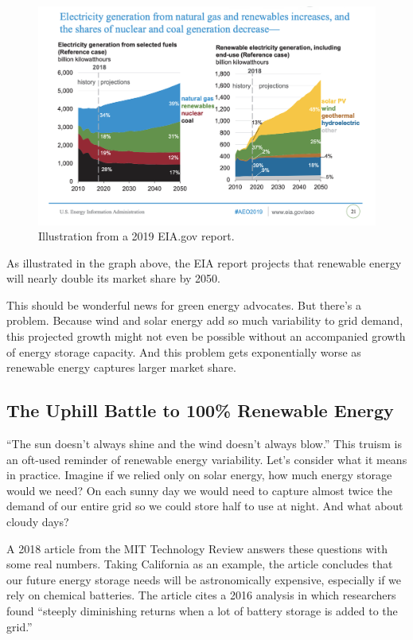 \documentclass[hidelinks,12pt,a4paper]{article}
\begin{document}
\begin{figure}[ht!]
    \centering
    \includegraphics[width=1.00\textwidth]{EIA-2019-energy-generation-projections.png}
    \caption{Illustration from a 2019 EIA.gov report. \cite{EIAForecastsRenewables}}
\end{figure}
\FloatBarrier

As illustrated in the graph above, the EIA report projects that renewable energy will nearly double its market share by 2050.

This should be wonderful news for green energy advocates. But there's a problem. Because wind and solar energy add so much variability to grid demand, this projected growth might not even be possible without an accompanied growth of energy storage capacity. And this problem gets exponentially worse as renewable energy captures larger market share.

\subsection{The Uphill Battle to 100\% Renewable Energy}
“The sun doesn’t always shine and the wind doesn’t always blow.” This truism is an oft-used reminder of renewable energy variability. Let's consider what it means in practice. Imagine if we relied only on solar energy, how much energy storage would we need? On each sunny day we would need to capture almost twice the demand of our entire grid so we could store half to use at night. And what about cloudy days?

A 2018 article from the MIT Technology Review answers these questions with some real numbers. Taking California as an example, the article concludes that our future energy storage needs will be astronomically expensive, especially if we rely on chemical batteries. The article cites a 2016 analysis \cite{EnergyStorageDecarbonizingElectricity} in which researchers found “steeply diminishing returns when a lot of battery storage is added to the grid.” \cite{TheTwoPointFiveTrillionReasonWeCantRelyOnBatteries}
\end{document}
